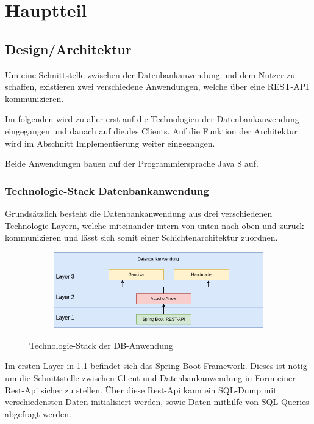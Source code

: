 \chapter{Hauptteil}

\section{Design/Architektur}
Um eine Schnittstelle zwischen der Datenbankanwendung und dem Nutzer zu schaffen, existieren zwei verschiedene Anwendungen, welche über eine REST-API kommunizieren.

Im folgenden wird zu aller erst auf die Technologien der Datenbankanwendung eingegangen und danach auf die,des Clients. Auf die Funktion der Architektur wird im Abschnitt Implementierung weiter eingegangen. 

Beide Anwendungen bauen auf der Programmiersprache Java 8 auf.

\subsection{Technologie-Stack Datenbankanwendung}

Grundsätzlich besteht die Datenbankanwendung aus drei verschiedenen Technologie Layern, welche miteinander intern von unten nach oben und zurück kommunizieren und lässt sich somit einer Schichtenarchitektur zuordnen. 



\begin{figure}[h]
  \centering
  \begin{subfigure}[b]{1.0\textwidth}
    \includegraphics[width=1.0\linewidth]{img/layerarch}
  \end{subfigure}
  \caption{Technologie-Stack der DB-Anwendung}
  \label{graf_1}
\end{figure}

Im ersten Layer in \ref{graf_1} befindet sich das Spring-Boot Framework.
Dieses ist nötig um die Schnittstelle zwischen Client und Datenbankanwendung in Form einer Rest-Api sicher zu stellen. 
Über diese Rest-Api kann ein SQL-Dump mit verschiedensten Daten initialisiert werden, sowie Daten mithilfe von SQL-Queries abgefragt werden.


